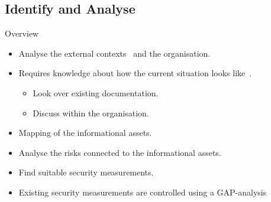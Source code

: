 \documentclass{beamer}
\begin{document}
\subsection{Identify and Analyse}
\begin{frame}{Overview}{\insertsubsectionhead}
  \begin{itemize}
    \item Analyse the external contexts~ and the organisation.
    \item Requires knowledge about how the current situation looks
      like~.
      \begin{itemize}
        \item Look over existing documentation.
        \item Discuss within the organisation.
      \end{itemize}
    \item Mapping of the informational assets.
    \item Analyse the risks connected to the informational assets.
    \item Find suitable security measurements.
    \item Existing security measurements are controlled using a GAP-analysis
  \end{itemize}
\end{frame}
\end{document}
